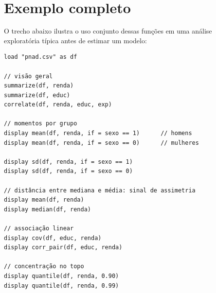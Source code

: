 \section{Exemplo completo}

O trecho abaixo ilustra o uso conjunto dessas funções em uma análise
exploratória típica antes de estimar um modelo:

\begin{lstlisting}[caption={Análise exploratória — renda e educação}]
load "pnad.csv" as df

// visão geral
summarize(df, renda)
summarize(df, educ)
correlate(df, renda, educ, exp)

// momentos por grupo
display mean(df, renda, if = sexo == 1)      // homens
display mean(df, renda, if = sexo == 0)      // mulheres

display sd(df, renda, if = sexo == 1)
display sd(df, renda, if = sexo == 0)

// distância entre mediana e média: sinal de assimetria
display mean(df, renda)
display median(df, renda)

// associação linear
display cov(df, educ, renda)
display corr_pair(df, educ, renda)

// concentração no topo
display quantile(df, renda, 0.90)
display quantile(df, renda, 0.99)
\end{lstlisting}
